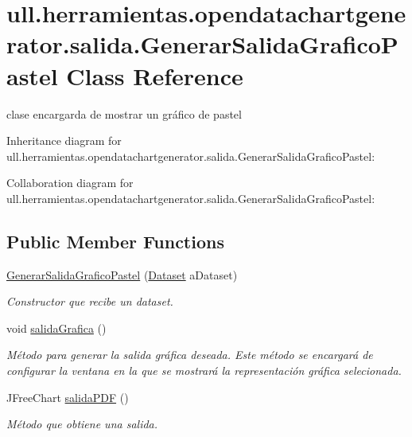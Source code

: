 \hypertarget{classull_1_1herramientas_1_1opendatachartgenerator_1_1salida_1_1_generar_salida_grafico_pastel}{}\section{ull.\+herramientas.\+opendatachartgenerator.\+salida.\+Generar\+Salida\+Grafico\+Pastel Class Reference}
\label{classull_1_1herramientas_1_1opendatachartgenerator_1_1salida_1_1_generar_salida_grafico_pastel}


clase encargarda de mostrar un gráfico de pastel  




Inheritance diagram for ull.\+herramientas.\+opendatachartgenerator.\+salida.\+Generar\+Salida\+Grafico\+Pastel\+:


Collaboration diagram for ull.\+herramientas.\+opendatachartgenerator.\+salida.\+Generar\+Salida\+Grafico\+Pastel\+:
\subsection*{Public Member Functions}
\begin{DoxyCompactItemize}
\item 
\mbox{\hyperlink{classull_1_1herramientas_1_1opendatachartgenerator_1_1salida_1_1_generar_salida_grafico_pastel_af175e7306ddf43273ecaf53d329d12eb}{Generar\+Salida\+Grafico\+Pastel}} (\mbox{\hyperlink{classull_1_1herramientas_1_1opendatachartgenerator_1_1_dataset}{Dataset}} a\+Dataset)
\begin{DoxyCompactList}\small\item\em Constructor que recibe un dataset. \end{DoxyCompactList}\item 
\mbox{\label{classull_1_1herramientas_1_1opendatachartgenerator_1_1salida_1_1_generar_salida_grafico_pastel_adceaf9369002ef0de219f80876a10b29}} 
void \mbox{\hyperlink{classull_1_1herramientas_1_1opendatachartgenerator_1_1salida_1_1_generar_salida_grafico_pastel_adceaf9369002ef0de219f80876a10b29}{salida\+Grafica}} ()
\begin{DoxyCompactList}\small\item\em Método para generar la salida gráfica deseada. Este método se encargará de configurar la ventana en la que se mostrará la representación gráfica selecionada. \end{DoxyCompactList}\item 
J\+Free\+Chart \mbox{\hyperlink{classull_1_1herramientas_1_1opendatachartgenerator_1_1salida_1_1_generar_salida_grafico_pastel_ad751df6b5bfef8e06f6b3601faad2440}{salida\+P\+DF}} ()
\begin{DoxyCompactList}\small\item\em Método que obtiene una salida. \end{DoxyCompactList}\end{DoxyCompactItemize}


